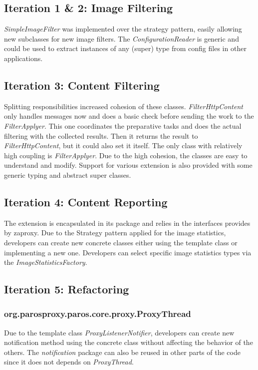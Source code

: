 \subsection{Iteration 1 \& 2: Image Filtering}
\textit{SimpleImageFilter} was implemented over the strategy pattern, easily allowing new subclasses for new image filters.
The \textit{ConfigurationReader} is generic and could be used to extract instances of any (super) type from config files in other applications.

\subsection{Iteration 3: Content Filtering}
Splitting responsibilities increased cohesion of these classes. \textit{FilterHttpContent} only handles messages now and does a basic check before sending the work to the \textit{FilterApplyer}. This one coordinates the preparative tasks and does the actual filtering with the collected results. Then it returns the result to \textit{FilterHttpContent}, but it could also set it itself.
The only class with relatively high coupling is \textit{FilterApplyer}.
Due to the high cohesion, the classes are easy to understand and modify. Support for various extension is also provided with some generic typing and abstract super classes.
\subsection{Iteration 4: Content Reporting}
The extension is encapsulated in its package and relies in the interfaces provides by zaproxy. Due to the Strategy pattern applied for the image statistics, developers can create new concrete classes either using the template class or implementing a new one. Developers can select specific image statistics types via the \textit{ImageStatisticsFactory}.

\subsection{Iteration 5: Refactoring}

\subsubsection{org.parosproxy.paros.core.proxy.ProxyThread}

Due to the template class \textit{ProxyListenerNotifier}, developers can create new notification method using the concrete class without affecting the behavior of the others. The \textit{notification} package can also be reused in other parts of the code since it does not depends on \textit{ProxyThread}. 
